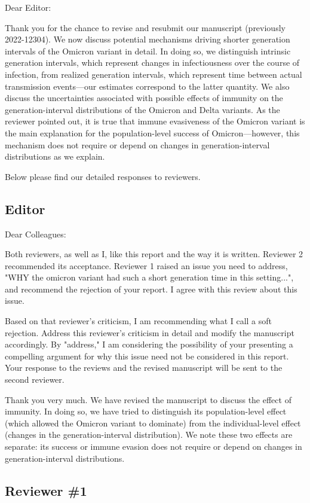 \documentclass[12pt]{article}
\newcommand{\rev}{\subsection*}
\newcommand{\revtext}{\textsf}
\begin{document}
\noindent Dear Editor:

Thank you for the chance to revise and resubmit our manuscript (previously 2022-12304). 
We now discuss potential mechanisms driving shorter generation intervals of the Omicron variant in detail.
In doing so, we distinguish intrinsic generation intervals, which represent changes in infectiousness over the course of infection, from realized generation intervals, which represent time between actual transmission events---our estimates correspond to the latter quantity.
We also discuss the uncertainties associated with possible effects of immunity on the generation-interval distributions of the Omicron and Delta variants.
As the reviewer pointed out, it is true that immune evasiveness of the Omicron variant is the main explanation for the population-level success of Omicron---however, this mechanism does not require or depend on changes in generation-interval distributions as we explain. 

Below please find our detailed responses to reviewers.

\rev{Editor}

\revtext{Dear Colleagues:}

\revtext{Both reviewers, as well as I, like this report and the way it is written. Reviewer 2 recommended its acceptance. Reviewer 1 raised an issue you need to address, "WHY the omicron variant had such a short generation time in this setting...", and 
recommend the rejection of your report. I agree with this review about this issue.}

\revtext{Based on that reviewer's criticism, I am recommending what I call a soft rejection. Address this reviewer's criticism in detail and modify the manuscript accordingly. By "address," I am considering the possibility of your presenting a compelling argument for why this issue need not be considered in this report. Your response to the reviews and the revised manuscript will be sent to the second reviewer.}

Thank you very much. We have revised the manuscript to discuss the effect of immunity. In doing so, we have tried to distinguish its population-level effect (which allowed the Omicron variant to dominate) from the individual-level effect (changes in the generation-interval distribution).
We note these two effects are separate: its success or immune evasion does not require or depend on changes in generation-interval distributions.

\rev{Reviewer \#1}
\end{document}
